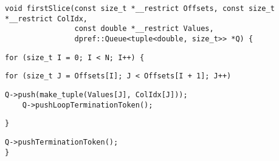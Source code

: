 \begin{lstlisting}[style=cppcode]
void firstSlice(const size_t *__restrict Offsets, const size_t *__restrict ColIdx,
                const double *__restrict Values,
                dpref::Queue<tuple<double, size_t>> *Q) {
\end{lstlisting}\vspace{-\baselineskip}

\begin{lstlisting}[style=cppcode, backgroundcolor=\color{yellow!15}, firstnumber=last]
  for (size_t I = 0; I < N; I++) {
\end{lstlisting}\vspace{-\baselineskip}

\begin{lstlisting}[style=cppcode, backgroundcolor=\color{red!15}, firstnumber=last]
    for (size_t J = Offsets[I]; J < Offsets[I + 1]; J++)
\end{lstlisting}\vspace{-\baselineskip}

\begin{lstlisting}[style=cppcode, firstnumber=last]
      Q->push(make_tuple(Values[J], ColIdx[J]));
    Q->pushLoopTerminationToken();
\end{lstlisting}\vspace{-\baselineskip}

\begin{lstlisting}[style=cppcode, backgroundcolor=\color{yellow!15}, firstnumber=last]
  }
\end{lstlisting}\vspace{-\baselineskip}

\begin{lstlisting}[style=cppcode, firstnumber=last]
  Q->pushTerminationToken();
}
\end{lstlisting}\vspace{-\baselineskip}
